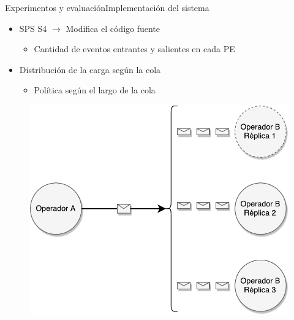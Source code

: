 \addtocounter{framenumber}{-1}
\begin{frame}{Experimentos y evaluación}{Implementación del sistema}
\begin{itemize}
\item SPS S4 $\rightarrow$ Modifica el código fuente
	\begin{itemize}
		\item Cantidad de eventos entrantes y salientes en cada PE
	\end{itemize}
\item Distribución de la carga según la cola
	\begin{itemize}
		\item Política según el largo de la cola
	\end{itemize}
\end{itemize}

\begin{figure}
  \center
    \includegraphics[scale=0.35]{images/DistribucionCarga-III.pdf}
\end{figure}
\end{frame}

